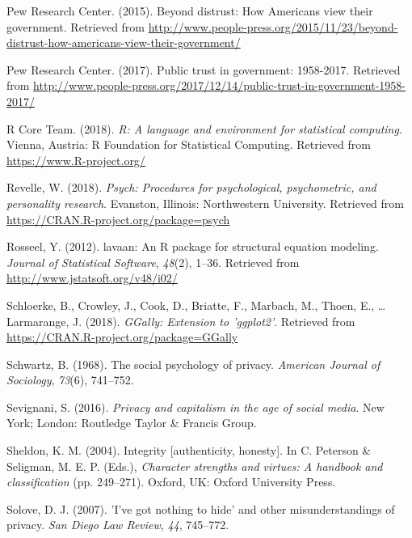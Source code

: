 \documentclass[man,floatsintext]{apa6}
\begin{document}
\leavevmode\hypertarget{ref-PewResearchCenter.2015c}{}%
Pew Research Center. (2015). Beyond distrust: How Americans view their government. Retrieved from \url{http://www.people-press.org/2015/11/23/beyond-distrust-how-americans-view-their-government/}

\leavevmode\hypertarget{ref-PewResearchCenter.2017}{}%
Pew Research Center. (2017). Public trust in government: 1958-2017. Retrieved from \url{http://www.people-press.org/2017/12/14/public-trust-in-government-1958-2017/}

\leavevmode\hypertarget{ref-R-base}{}%
R Core Team. (2018). \emph{R: A language and environment for statistical computing}. Vienna, Austria: R Foundation for Statistical Computing. Retrieved from \url{https://www.R-project.org/}

\leavevmode\hypertarget{ref-R-psych}{}%
Revelle, W. (2018). \emph{Psych: Procedures for psychological, psychometric, and personality research}. Evanston, Illinois: Northwestern University. Retrieved from \url{https://CRAN.R-project.org/package=psych}

\leavevmode\hypertarget{ref-R-lavaan}{}%
Rosseel, Y. (2012). lavaan: An R package for structural equation modeling. \emph{Journal of Statistical Software}, \emph{48}(2), 1--36. Retrieved from \url{http://www.jstatsoft.org/v48/i02/}

\leavevmode\hypertarget{ref-R-GGally}{}%
Schloerke, B., Crowley, J., Cook, D., Briatte, F., Marbach, M., Thoen, E., \ldots{} Larmarange, J. (2018). \emph{GGally: Extension to 'ggplot2'}. Retrieved from \url{https://CRAN.R-project.org/package=GGally}

\leavevmode\hypertarget{ref-Schwartz.1968}{}%
Schwartz, B. (1968). The social psychology of privacy. \emph{American Journal of Sociology}, \emph{73}(6), 741--752.

\leavevmode\hypertarget{ref-Sevignani.2016}{}%
Sevignani, S. (2016). \emph{Privacy and capitalism in the age of social media}. New York; London: Routledge Taylor \& Francis Group.

\leavevmode\hypertarget{ref-Sheldon.2004}{}%
Sheldon, K. M. (2004). Integrity {[}authenticity, honesty{]}. In C. Peterson \& Seligman, M. E. P. (Eds.), \emph{Character strengths and virtues: A handbook and classification} (pp. 249--271). Oxford, UK: Oxford University Press.

\leavevmode\hypertarget{ref-Solove.2007}{}%
Solove, D. J. (2007). 'I've got nothing to hide' and other misunderstandings of privacy. \emph{San Diego Law Review}, \emph{44}, 745--772.
\end{document}
